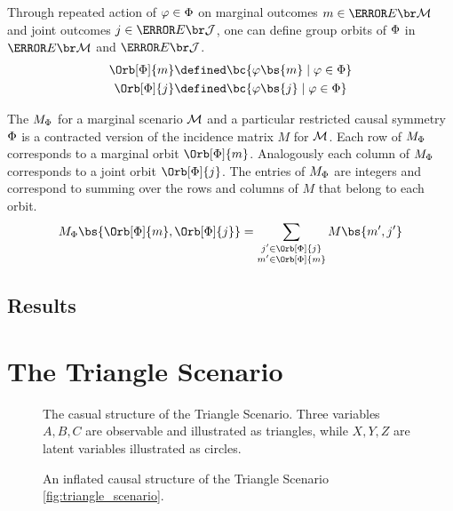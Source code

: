\documentclass[aps, 10pt, english, twoside, pra, nofootinbib, longbibliography]{revtex4-1}
\begin{document}
    Through repeated action of $\varphi \in \Phi$ on marginal outcomes $m \in \Events{\mscenario}$ and joint outcomes $j \in \Events{\jointvar}$, one can define group orbits of $\Phi$ in $\Events{\mscenario}$ and $\Events{\jointvar}$.
    \begin{align*}
        \Orb[\gp]{m} &\defined \bc{\gep\bs{m} \mid \gep \in \gp} \\
        \Orb[\gp]{j} &\defined \bc{\gep\bs{j} \mid \gep \in \gp}
    \end{align*}

    \begin{definition}
        The  $M_{\Phi}$ for a marginal scenario $\mathcal{M}$ and a particular restricted causal symmetry $\Phi$ is a contracted version of the incidence matrix $M$ for $\mathcal{M}$. Each row of $M_{\Phi}$ corresponds to a marginal orbit $\Orb[\gp]{m}$. Analogously each column of $M_{\Phi}$ corresponds to a joint orbit $\Orb[\gp]{j}$. The entries of $M_{\Phi}$ are integers and correspond to summing over the rows and columns of $M$ that belong to each orbit.
        \[ M_{\gp}\bs{\Orb[\gp]{m}, \Orb[\gp]{j}} = \sum_{\substack{j' \in \Orb[\gp]{j} \\ m' \in \Orb[\gp]{m}}} M\bs{m',j'} \]
    \end{definition}

    \subsection{Results}


    \section{The Triangle Scenario}
    \label{sec:triangle_scenario}
    \begin{figure}
    \begin{center}
        \begin{minipage}[b]{.48\textwidth}
            \centering
            \scalebox{1.0}{}
            \caption{The casual structure of the Triangle Scenario. Three variables $A,B,C$ are observable and illustrated as triangles, while $X, Y, Z$ are latent variables illustrated as circles.}
            \label{fig:triangle_scenario}
        \end{minipage}\hspace{0.04\textwidth}%
        \begin{minipage}[b]{.48\textwidth}
            \centering
            \scalebox{0.8}{}
            \caption{An inflated causal structure of the Triangle Scenario \cref{fig:triangle_scenario}.}
            \label{fig:inflated_triangle_scenario}
        \end{minipage}
    \end{center}
    \end{figure}
\end{document}
